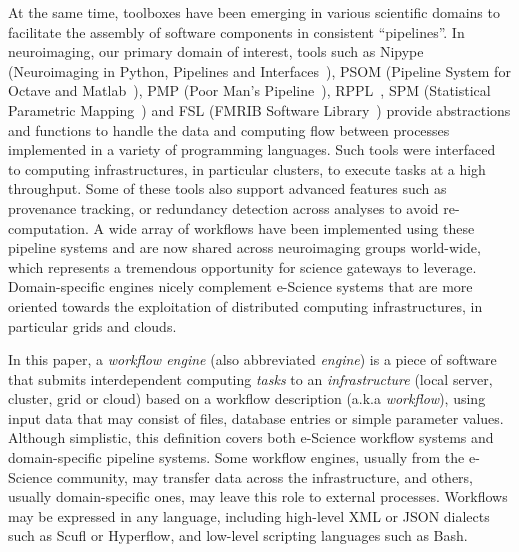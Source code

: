 \documentclass[preprint,3p,twocolumn]{elsarticle}
\newcommand{\note}[2]{\pdfmargincomment[color=yellow,author=#1,open=true]{#2}}
\newcommand{\closednote}[4]{} %
\begin{document}
At the same time, toolboxes have been emerging in various scientific
domains to facilitate the assembly of software components in
consistent ``pipelines''. In neuroimaging, our primary domain of
interest, tools such as Nipype (Neuroimaging in Python, Pipelines and
Interfaces~\cite{gorgolewski2011nipype}), PSOM (Pipeline System for
Octave and Matlab~\cite{bellec2012pipeline}), 
PMP (Poor Man's Pipeline~\cite{Ad-DabbaghY2006}), RPPL~\cite{1174106}, SPM (Statistical
Parametric Mapping~\cite{ashburner2011spm}) and FSL (FMRIB Software
Library~\cite{Jenkinson2012782}) provide abstractions and functions to
handle the data and computing flow between processes implemented in a
variety of programming languages. Such tools were interfaced to
computing infrastructures, in particular
clusters\closednote{Tristan}{Reverted from Marc's 'cluster
  scheduler'}{}{}, to execute tasks at a high throughput. Some of
these tools also support advanced features such as provenance
tracking, \closednote{Naj}{should we not mention PMP which is used for
  CIVET?}{Tristan}{Done, as discussed.} or  redundancy detection across
analyses to avoid re-computation. A wide array of workflows
have been implemented using these pipeline systems and are now shared across
neuroimaging groups world-wide, which represents a tremendous
opportunity for science gateways to leverage. Domain-specific engines
nicely complement e-Science systems that are more oriented towards the
exploitation of distributed computing infrastructures, in particular
grids and clouds.

In this paper, a
\emph{workflow engine} (also abbreviated \emph{engine}) is a piece of
software that submits interdependent computing \emph{tasks} to an
\emph{infrastructure} (local server, cluster, grid or cloud) based on
a workflow description (a.k.a \emph{workflow}), \closednote{Naj}{I think and is redundant here, you can replace is with a comma}{Tristan}{yes!} using input data
that may consist of files, database entries or simple parameter
values. Although simplistic, this definition covers both e-Science workflow systems and
domain-specific pipeline systems.\closednote{Marc-e}{To remain consistent with above descriptions}{Tristan}{yes!} 
Some workflow engines, 
usually from the e-Science community, 
may transfer data across the infrastructure, and others, usually
domain-specific ones, may leave this role to external processes. Workflows
may be expressed in any language, including high-level XML or JSON
dialects such as Scufl or Hyperflow, and low-level scripting languages
such as Bash.
\end{document}
